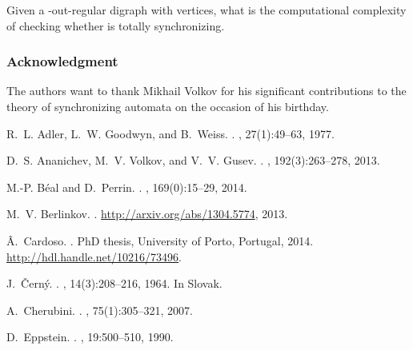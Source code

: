 \documentclass[runningheads]{llncs}
\begin{document}
\begin{problem}
Given a -out-regular digraph  with  vertices, what is the computational complexity of checking whether  is totally synchronizing.
\end{problem}

\subsubsection{Acknowledgment}
The authors want to thank Mikhail Volkov for his significant contributions to the theory of synchronizing automata on the occasion of his  birthday.



\begin{thebibliography}{10}

R.~L. Adler, L.~W. Goodwyn, and B.~Weiss.
.
, 27(1):49--63, 1977.

D.~S. Ananichev, M.~V. Volkov, and V.~V. Gusev.
.
, 192(3):263--278, 2013.

M.-P. B{\'e}al and D.~Perrin.
.
, 169(0):15--29, 2014.

M.~V. Berlinkov.
.
\newblock \url{http://arxiv.org/abs/1304.5774}, 2013.

{\^A}.~Cardoso.
.
\newblock PhD thesis, University of Porto, Portugal, 2014.
\newblock \url{http://hdl.handle.net/10216/73496}.

J.~{\v{C}ern\'{y}}.
.
, 14(3):208--216, 1964.
\newblock In Slovak.

A.~Cherubini.
.
, 75(1):305--321, 2007.

D.~Eppstein.
.
, 19:500--510, 1990.


\end{thebibliography}
\end{document}

